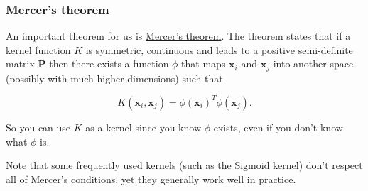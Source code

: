 \documentclass{beamer}
\begin{document}
\begin{frame}
\frametitle{Mercer's theorem}

An important theorem for us is \href{{https://en.wikipedia.org/wiki/Mercer%27s_theorem}}{Mercer's
theorem}.  The
theorem states that if a kernel function $K$ is symmetric, continuous
and leads to a positive semi-definite matrix $\bm{P}$ then there
exists a function $\phi$ that maps $\bm{x}_i$ and $\bm{x}_j$ into
another space (possibly with much higher dimensions) such that

\[
K(\bm{x}_i,\bm{x}_j)=\phi(\bm{x}_i)^T\phi(\bm{x}_j).
\]

So you can use $K$ as a kernel since you know $\phi$ exists, even if
you don’t know what $\phi$ is. 

Note that some frequently used kernels (such as the Sigmoid kernel)
don’t respect all of Mercer’s conditions, yet they generally work well
in practice.
\end{frame}
\end{document}
